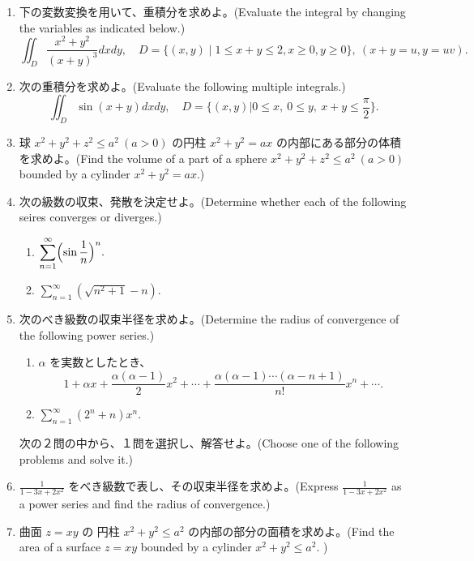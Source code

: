 \begin{enumerate}
\item 下の変数変換を用いて、重積分を求めよ。(Evaluate the integral by changing the variables as indicated below.)
$$\iint_D \frac{x^2+y^2}{(x+y)^3}dxdy,\quad D = \{(x,y)\mid 1\leq x+y\leq 2, x\geq 0,y\geq 0\}, \:(x + y = u, y = uv).$$


\item 次の重積分を求めよ。(Evaluate the following multiple integrals.)
$$\iint_D \sin(x+y)dxdy, \quad D = \{(x,y)| 0\leq x, \:0\leq y, \:x+y \leq\frac{\pi}2\}.$$

\item 球 $x^2 + y^2 + z^2 \leq a^2 \:(a>0)$ の円柱 $x^2 + y^2 = ax$ の内部にある部分の体積を求めよ。(Find the volume of a part of a sphere $x^2 + y^2 + z^2 \leq a^2 \:(a>0)$ bounded by a cylinder $x^2 + y^2 = ax$.)

\item 次の級数の収束、発散を決定せよ。(Determine whether each of the following seires converges or diverges.)
     \begin{enumerate}
     \item $\displaystyle{\sum_{n=1}^{\infty}\Bigl(\sin\frac1n\Bigr)^n}.$
     \item $\displaystyle{\sum_{n=1}^{\infty}(\sqrt{n^2 + 1} - n)}.$
     \end{enumerate}

\item 次のべき級数の収束半径を求めよ。(Determine the radius of convergence of the following power series.)
     \begin{enumerate}
     \item $\alpha$ を実数としたとき、
$$1 + \alpha x + \frac{\alpha(\alpha-1)}{2}x^2 + \cdots + \frac{\alpha(\alpha-1)\cdots(\alpha - n + 1)}{n!}x^n + \cdots. $$
     \item $\displaystyle{\sum_{n=1}^{\infty}(2^n + n)x^n}.$
     \end{enumerate}

\vspace{3ex}
\noindent
次の２問の中から、１問を選択し、解答せよ。(Choose one of the following problems and solve it.)
     
\item ${\displaystyle \frac{1}{1-3x + 2x^2}}$ をべき級数で表し、その収束半径を求めよ。(Express ${\displaystyle \frac{1}{1-3x + 2x^2}}$ as a power series and find the radius of convergence.)

\item 曲面 $z = xy$ の 円柱 $x^2 + y^2 \leq a^2$  の内部の部分の面積を求めよ。(Find the area of a surface $z = xy$ bounded by a cylinder $x^2 + y^2 \leq a^2$. )
\end{enumerate}
    



